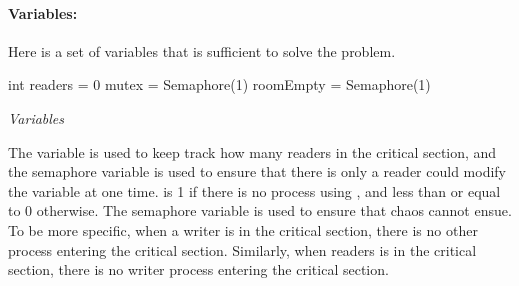 \documentclass[a4paper, 10pt]{article}
\begin{document}
\paragraph{Variables:} Here is a set of variables that is sufficient to solve the problem.  
\begin{mycodeblock}
int readers = 0
mutex = Semaphore(1)
roomEmpty = Semaphore(1)
\end{mycodeblock}
\begin{center}
\textit{Variables}
\end{center}
The {} variable is used to keep track how many readers in the critical section, and the semaphore variable {} is used to ensure that there is only a reader could modify the {} variable at one time. {} is 1 if there is no process using {}, and less than or equal to 0 otherwise. The semaphore variable {} is used to ensure that chaos cannot ensue. To be more specific, when a writer is in the critical section, there is no other process entering the critical section. Similarly, when readers is in the critical section, there is no writer process entering the critical section.
\end{document}
